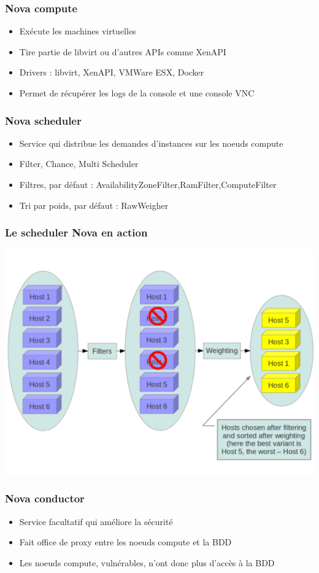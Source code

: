   \begin{frame}
    \frametitle{Nova compute}
    \begin{itemize}
      \item Exécute les machines virtuelles
      \item Tire partie de libvirt ou d'autres APIs comme XenAPI
      \item Drivers : libvirt, XenAPI, VMWare ESX, Docker
      \item Permet de récupérer les logs de la console et une console VNC
    \end{itemize}
  \end{frame}

  \begin{frame}
    \frametitle{Nova scheduler}
    \begin{itemize}
      \item Service qui distribue les demandes d'instances sur les noeuds compute
      \item Filter, Chance, Multi Scheduler
      \item Filtres, par défaut : AvailabilityZoneFilter,RamFilter,ComputeFilter
      \item Tri par poids, par défaut : RawWeigher
    \end{itemize}
  \end{frame}

  \begin{frame}
    \frametitle{Le scheduler Nova en action}
    \includegraphics[width=\textwidth]{images/scheduling-schema.png}
  \end{frame}

  \begin{frame}
    \frametitle{Nova conductor}
    \begin{itemize}
      \item Service facultatif qui améliore la sécurité
      \item Fait office de proxy entre les noeuds compute et la BDD
      \item Les noeuds compute, vulnérables, n'ont donc plus d'accès à la BDD
    \end{itemize}
  \end{frame}

